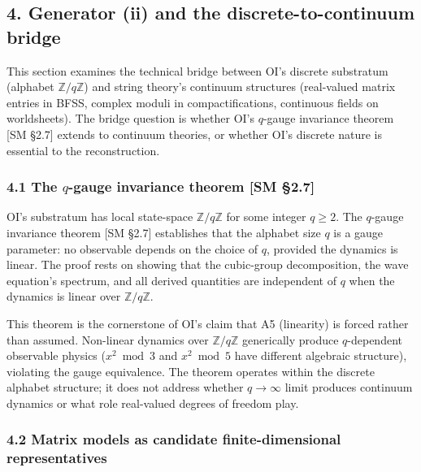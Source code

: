 \documentclass[
]{article}
\begin{document}
\hypertarget{generator-ii-and-the-discrete-to-continuum-bridge}{%
\subsection{4. Generator (ii) and the discrete-to-continuum
bridge}\label{generator-ii-and-the-discrete-to-continuum-bridge}}

This section examines the technical bridge between OI's discrete
substratum (alphabet \(\mathbb{Z}/q\mathbb{Z}\)) and string theory's
continuum structures (real-valued matrix entries in BFSS, complex moduli
in compactifications, continuous fields on worldsheets). The bridge
question is whether OI's \(q\)-gauge invariance theorem {[}SM §2.7{]}
extends to continuum theories, or whether OI's discrete nature is
essential to the reconstruction.

\hypertarget{the-q-gauge-invariance-theorem-sm-2.7}{%
\subsubsection{\texorpdfstring{4.1 The \(q\)-gauge invariance theorem
{[}SM
§2.7{]}}{4.1 The q-gauge invariance theorem {[}SM §2.7{]}}}\label{the-q-gauge-invariance-theorem-sm-2.7}}

OI's substratum has local state-space \(\mathbb{Z}/q\mathbb{Z}\) for
some integer \(q \geq 2\). The \(q\)-gauge invariance theorem {[}SM
§2.7{]} establishes that the alphabet size \(q\) is a gauge parameter:
no observable depends on the choice of \(q\), provided the dynamics is
linear. The proof rests on showing that the cubic-group decomposition,
the wave equation's spectrum, and all derived quantities are independent
of \(q\) when the dynamics is linear over \(\mathbb{Z}/q\mathbb{Z}\).

This theorem is the cornerstone of OI's claim that A5 (linearity) is
forced rather than assumed. Non-linear dynamics over
\(\mathbb{Z}/q\mathbb{Z}\) generically produce \(q\)-dependent
observable physics (\(x^2 \bmod 3\) and \(x^2 \bmod 5\) have different
algebraic structure), violating the gauge equivalence. The theorem
operates within the discrete alphabet structure; it does not address
whether \(q \to \infty\) limit produces continuum dynamics or what role
real-valued degrees of freedom play.

\hypertarget{matrix-models-as-candidate-finite-dimensional-representatives}{%
\subsubsection{4.2 Matrix models as candidate finite-dimensional
representatives}\label{matrix-models-as-candidate-finite-dimensional-representatives}}
\end{document}

